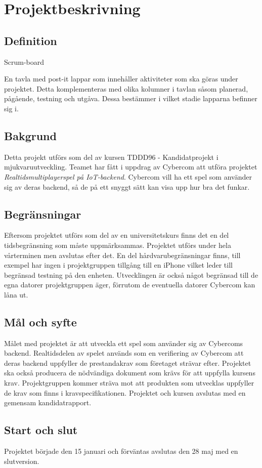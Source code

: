 \section{Projektbeskrivning}

\subsection{Definition}
\begin{labeling}{Scrum-board}
\item [Scrum-board] En tavla med post-it lappar som innehåller aktiviteter som ska göras under 
    projektet. Detta komplementeras med olika kolumner i tavlan såsom planerad, pågående, 
    testning och utgåva. Dessa bestämmer i vilket stadie lapparna befinner sig i. 
\item
\end{labeling}


\subsection{Bakgrund}
Detta projekt utförs som del av kursen TDDD96 - Kandidatprojekt i mjukvaruutveckling. Teamet har fått i uppdrag av Cybercom att utföra projektet \textit{Realtidsmultiplayerspel på IoT-backend}. Cybercom vill ha ett spel som använder sig av deras backend, så de på ett snyggt sätt kan visa upp hur bra det funkar.

\subsection{Begränsningar}
Eftersom projektet utförs som del av en universitetskurs finns det en del tidsbegränsning som måste uppmärksammas. Projektet utförs under hela vårterminen men avslutas efter det. En del hårdvarubegränsningar finns, till exempel har ingen i projektgruppen tillgång till en iPhone vilket leder till begränsad testning på den enheten. Utvecklingen är också något begränsad till de egna datorer projektgruppen äger, förrutom de eventuella datorer Cybercom kan låna ut.

\subsection{Mål och syfte}
Målet med projektet är att utveckla ett spel som använder sig av Cybercoms backend. Realtidsdelen av spelet används som en verifiering av Cybercom att deras backend uppfyller de prestandakrav som företaget strävar efter. Projektet ska också producera de nödvändiga dokument som krävs för att uppfylla kursens krav\cite{bib-tddd96}. Projektgruppen kommer sträva mot att produkten som utvecklas uppfyller de krav som finns i kravspecifikationen\cite{bib-kravspec}. Projektet och kursen avslutas med en gemensam kandidatrapport.



\subsection{Start och slut}
Projektet började den 15 januari och förväntas avslutas den 28 maj med en slutversion.

\pagebreak
